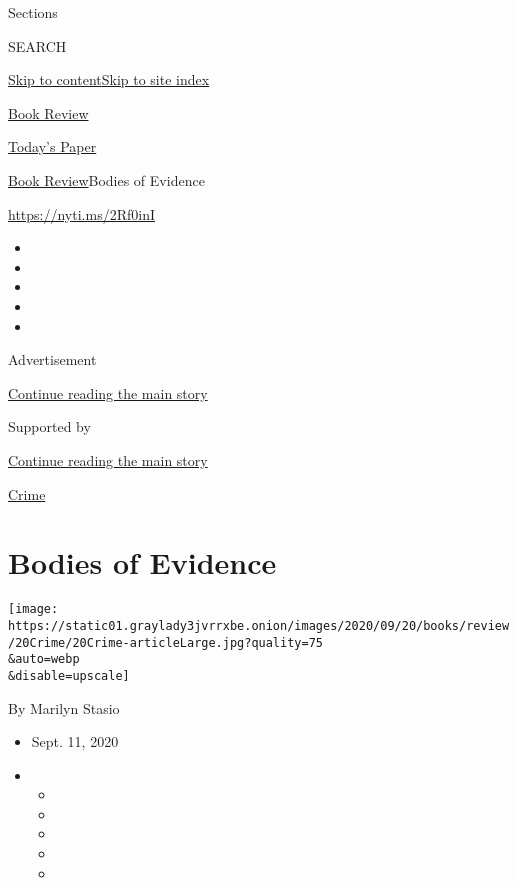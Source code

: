 Sections

SEARCH

\protect\hyperlink{site-content}{Skip to
content}\protect\hyperlink{site-index}{Skip to site index}

\href{https://www.nytimes3xbfgragh.onion/section/books/review}{Book
Review}

\href{https://myaccount.nytimes3xbfgragh.onion/auth/login?response_type=cookie\&client_id=vi}{}

\href{https://www.nytimes3xbfgragh.onion/section/todayspaper}{Today's
Paper}

\href{/section/books/review}{Book Review}\textbar{}Bodies of Evidence

\url{https://nyti.ms/2Rf0inI}

\begin{itemize}
\item
\item
\item
\item
\item
\end{itemize}

Advertisement

\protect\hyperlink{after-top}{Continue reading the main story}

Supported by

\protect\hyperlink{after-sponsor}{Continue reading the main story}

\href{/column/crime}{Crime}

\hypertarget{bodies-of-evidence}{%
\section{Bodies of Evidence}\label{bodies-of-evidence}}

\texttt{[image: https://static01.graylady3jvrrxbe.onion/images/2020/09/20/books/review/20Crime/20Crime-articleLarge.jpg?quality=75\\\&auto=webp\\\&disable=upscale]}

By Marilyn Stasio

\begin{itemize}
\item
  Sept. 11, 2020
\item
  \begin{itemize}
  \item
  \item
  \item
  \item
  \item
  \end{itemize}
\end{itemize}

